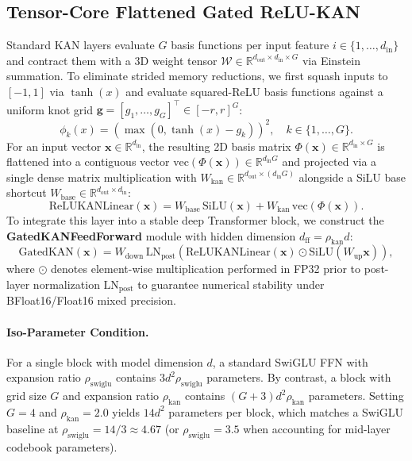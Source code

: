 \documentclass[11pt,a4paper]{article}
\newcommand{\R}{\mathbb{R}}
\begin{document}
\subsection{Tensor-Core Flattened Gated ReLU-KAN}
Standard KAN layers evaluate $G$ basis functions per input feature $i \in \{1, \dots, d_{\text{in}}\}$ and contract them with a 3D weight tensor $\mathcal{W} \in \R^{d_{\text{out}} \times d_{\text{in}} \times G}$ via Einstein summation. To eliminate strided memory reductions, we first squash inputs to $[-1, 1]$ via $\tanh(x)$ and evaluate squared-ReLU basis functions against a uniform knot grid $\bm{g} = [g_1, \dots, g_G]^\top \in [-r, r]^G$:
\begin{equation}
    \phi_k(x) = \left(\max(0, \tanh(x) - g_k)\right)^2, \quad k \in \{1, \dots, G\}.
\end{equation}
For an input vector $\bm{x} \in \R^{d_{\text{in}}}$, the resulting 2D basis matrix $\Phi(\bm{x}) \in \R^{d_{\text{in}} \times G}$ is flattened into a contiguous vector $\text{vec}(\Phi(\bm{x})) \in \R^{d_{\text{in}} G}$ and projected via a single dense matrix multiplication with $W_{\text{kan}} \in \R^{d_{\text{out}} \times (d_{\text{in}}G)}$ alongside a SiLU base shortcut $W_{\text{base}} \in \R^{d_{\text{out}} \times d_{\text{in}}}$:
\begin{equation}
    \text{ReLUKANLinear}(\bm{x}) = W_{\text{base}} \, \text{SiLU}(\bm{x}) + W_{\text{kan}} \, \text{vec}\!\left(\Phi(\bm{x})\right).
\end{equation}
To integrate this layer into a stable deep Transformer block, we construct the \textbf{GatedKANFeedForward} module with hidden dimension $d_{\text{ff}} = \rho_{\text{kan}} d$:
\begin{equation}
    \text{GatedKAN}(\bm{x}) = W_{\text{down}} \, \text{LN}_{\text{post}}\!\left( \text{ReLUKANLinear}(\bm{x}) \odot \text{SiLU}(W_{\text{up}}\bm{x}) \right),
\end{equation}
where $\odot$ denotes element-wise multiplication performed in FP32 prior to post-layer normalization $\text{LN}_{\text{post}}$ to guarantee numerical stability under BFloat16/Float16 mixed precision.

\paragraph{Iso-Parameter Condition.}
For a single block with model dimension $d$, a standard SwiGLU FFN with expansion ratio $\rho_{\text{swiglu}}$ contains $3 d^2 \rho_{\text{swiglu}}$ parameters. By contrast, a  block with grid size $G$ and expansion ratio $\rho_{\text{kan}}$ contains $(G + 3) d^2 \rho_{\text{kan}}$ parameters. Setting $G=4$ and $\rho_{\text{kan}} = 2.0$ yields $14 d^2$ parameters per block, which matches a SwiGLU baseline at $\rho_{\text{swiglu}} = 14 / 3 \approx 4.67$ (or $\rho_{\text{swiglu}} = 3.5$ when accounting for mid-layer codebook parameters).
\end{document}
